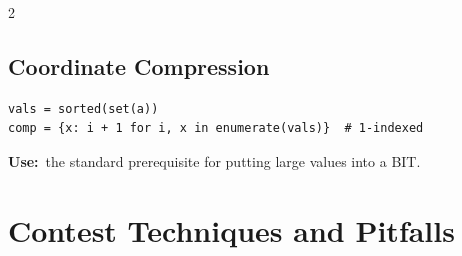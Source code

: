 \documentclass[10pt]{article}
\newcommand{\uses}[1]{{\color{accent2}\footnotesize\textbf{Use:}}~{\footnotesize #1}\par}
\begin{document}
\begin{multicols}{2}
\subsection{Coordinate Compression}
\begin{lstlisting}
vals = sorted(set(a))
comp = {x: i + 1 for i, x in enumerate(vals)}  # 1-indexed
\end{lstlisting}
\uses{the standard prerequisite for putting large values into a BIT.}

\end{multicols}

\section{Contest Techniques and Pitfalls}
\end{document}
